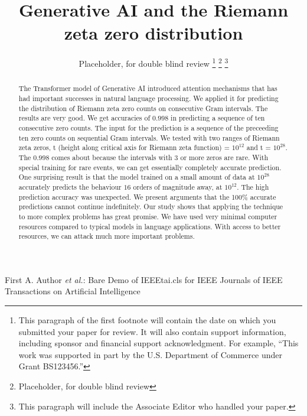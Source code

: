 \documentclass[journal]{IEEEtai}
\begin{document}
\title{Generative AI and the Riemann zeta zero distribution} 


\author{Placeholder, for double blind review
\thanks{This paragraph of the first footnote will contain the date on which you submitted your paper for review. It will also contain support information, including sponsor and financial support acknowledgment. For example, ``This work was supported in part by the U.S. Department of Commerce under Grant BS123456.'' }
\thanks{Placeholder, for double blind review}
\thanks{This paragraph will include the Associate Editor who handled your paper.}}

{First A. Author \MakeLowercase{\textit{et al.}}: Bare Demo of IEEEtai.cls for IEEE Journals of IEEE Transactions on Artificial Intelligence}

\maketitle

\begin{abstract}
The Transformer model of Generative AI introduced attention mechanisms that has had important successes in natural language processing.  We applied it for predicting the distribution of Riemann zeta zero counts on consecutive Gram intervals. The results are very good. We get accuracies of $0.998$ in predicting a sequence of ten consecutive zero counts. The input for the prediction is a sequence of the preceeding ten zero counts on sequential Gram intervals. We tested with two ranges of Riemann zeta zeros, t (height along critical axis for Riemann zeta function) = $10^{12}$ and t = $10^{28}$. The $0.998$ comes about because the intervals with $3$ or more zeros are rare. With special training for rare events, we can get essentially completely accurate prediction. One surprising result is that the model trained on a small amount of data at $10^{28}$ accurately predicts the behaviour $16$ orders of magnitude away, at $10^{12}$. The high prediction accuracy was unexpected. We present arguments that the 100\% accurate predictions cannot continue indefinitely. Our study shows that applying the technique to more complex problems has great promise. We have used very minimal computer resources compared to typical models in language applications. With access to better resources, we can attack much more important problems. 
\end{abstract}
\end{document}
